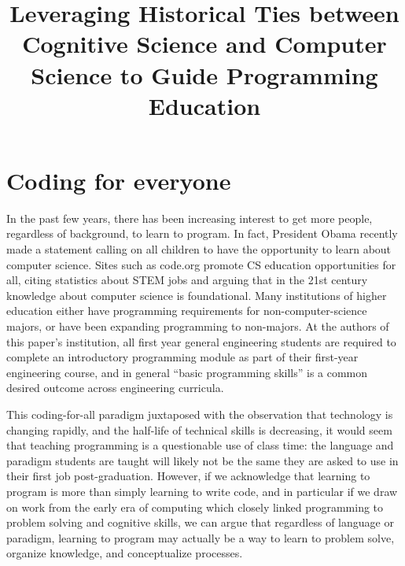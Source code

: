 \documentclass[12pt]{article}
\title{\large \textbf{Leveraging Historical Ties between Cognitive Science and
  Computer Science to Guide Programming Education}}
\author{}
\date{}
\begin{document}
\raggedright
\maketitle
\thispagestyle{empty}
\pagestyle{empty}

\section*{Coding for everyone}
In the past few years, there has been increasing interest to get more
people, regardless of background, to learn to program. In fact,
President Obama recently made a statement calling on all children to
have the opportunity to learn about computer
science\autocite{whitehouse_computer_2016}. Sites such as code.org
promote CS education opportunities for all, citing statistics about
STEM jobs and arguing that in the 21st century knowledge about
computer science is foundational\autocite{code.org_every_2016}. Many
institutions of higher education either have programming requirements
for non-computer-science majors, or have been expanding programming to
non-majors\autocite{rich_cs1_2004,forte_motivation_2005,guzdial_design_2005}. At
the authors of this paper's institution, all first year general
engineering students are required to complete an introductory
programming module as part of their first-year engineering course, and
in general ``basic programming skills'' is a common desired outcome
across engineering
curricula\autocite{reid_classification_2014}.

This coding-for-all paradigm juxtaposed with the observation that
technology is changing rapidly, and the half-life of technical skills
is decreasing\autocite{nae_educating_2004}, it would seem that
teaching programming is a questionable use of class time: the language
and paradigm students are taught will likely not be the same they are
asked to use in their first job post-graduation. However, if we
acknowledge that learning to program is more than simply learning to
write code, and in particular if we draw on work from the early era of
computing which closely linked programming to problem solving and
cognitive skills, we can argue that regardless of language or
paradigm, learning to program may actually be a way to learn to
problem solve, organize knowledge, and conceptualize processes.
\end{document}
